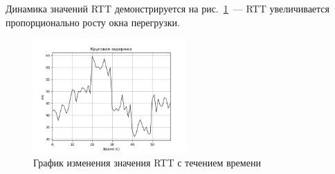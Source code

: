 Динамика значений RTT демонстрируется на рис.~\ref{fig:30014}~--- %
RTT увеличивается пропорционально росту окна перегрузки.

\begin{figure}[!h]
\centering
\includegraphics[width=0.52\textwidth]{image/ch03_02/rtt.png}
\caption{График изменения значения RTT с течением
  времени}\label{fig:30014}
\end{figure}


